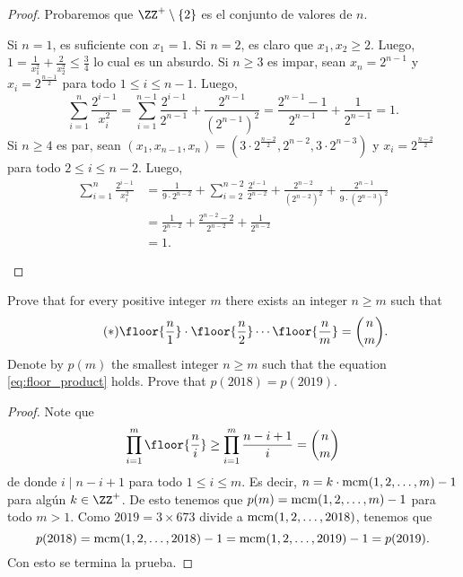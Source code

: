 \begin{proof}
	Probaremos que $\ZZ^+\setminus\{2\}$ es el conjunto de valores de $n$.
	\begin{itemize}
		\ii Si $n=1$, es suficiente con $x_1=1$.
		\ii Si $n=2$, es claro que $x_1,x_2\ge 2$. Luego, $1=\frac{1}{x_1^2}+\frac{2}{x_2^2}\le\frac34$ lo cual es un absurdo.
		\ii Si $n\ge 3$ es impar, sean $x_n=2^{n-1}$ y $x_i=2^\frac{n-1}{2}$ para todo $1\le i\le n-1$. Luego,
		\[\sum_{i=1}^n\frac{2^{i-1}}{x_i^2}=\sum_{i=1}^{n-1}\frac{2^{i-1}}{2^{n-1}}+\frac{2^{n-1}}{(2^{n-1})^2}=\frac{2^{n-1}-1}{2^{n-1}}+\frac{1}{2^{n-1}}=1.\]
		\ii Si $n\ge 4$ es par, sean $(x_1,x_{n-1},x_n)=\left(3\cdot 2^\frac{n-2}{2},2^{n-2},3\cdot 2^{n-3}\right)$ y $x_i=2^\frac{n-2}{2}$ para todo $2\le i\le n-2$. Luego,
		\begin{align*}
			\sum_{i=1}^n\frac{2^{i-1}}{x_i^2}
			&=\frac{1}{9\cdot 2^{n-2}}+\sum_{i=2}^{n-2}\frac{2^{i-1}}{2^{n-2}}+\frac{2^{n-2}}{(2^{n-2})^2}+\frac{2^{n-1}}{9\cdot(2^{n-3})^2}\\
			&=\frac{1}{2^{n-2}}+\frac{2^{n-2}-2}{2^{n-2}}+\frac{1}{2^{n-2}}\\
			&=1.
		\end{align*}
	\end{itemize}
\end{proof}

\begin{probEG}[MEMO 2018 I-4]
	\begin{enumerate}[(a)]
		\ii Prove that for every positive integer $m$ there exists an integer $n\ge m$ such that
		\begin{equation}\label{eq:floor_product}\tag{$\ast$}
			\floor{\frac n1}\cdot\floor{\frac n2}\cdots\floor{\frac nm}=\binom nm.
		\end{equation}
		\ii Denote by $p(m)$ the smallest integer $n\ge m$ such that the equation \eqref{eq:floor_product} holds. Prove that $p(2018)=p(2019)$.
	\end{enumerate}
\end{probEG}

\begin{proof}
	Note que
	\[\prod_{i=1}^m\floor{\frac ni}\ge\prod_{i=1}^m\frac{n-i+1}{i}=\binom nm\]
	de donde $i\mid n-i+1$ para todo $1\le i\le m$. Es decir, $n=k\cdot\operatorname{mcm}(1,2,\dots,m)-1$ para algún $k\in\ZZ^+$. De esto tenemos que $p(m)=\operatorname{mcm}(1,2,\dots,m)-1$ para todo $m>1$. Como $2019=3\times 673$ divide a $\operatorname{mcm}(1,2,\dots,2018)$, tenemos que
	\[p(2018)=\operatorname{mcm}(1,2,\dots,2018)-1=\operatorname{mcm}(1,2,\dots,2019)-1=p(2019).\]
	Con esto se termina la prueba.
\end{proof}

